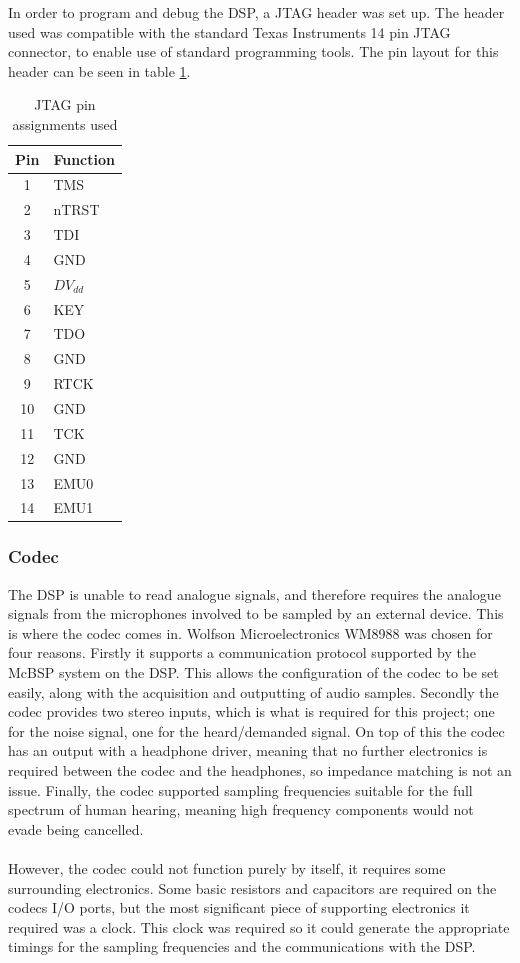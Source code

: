 \noindent In order to program and debug the DSP, a JTAG header was set up.
The header used was compatible with the standard Texas Instruments 14 pin JTAG connector, to enable use of standard programming tools.
The pin layout for this header can be seen in table \ref{tab:jtagpinout}.

\begin{table}[H]
	\centering
	\begin{tabular}[c]{| c | l |}
		\hline
		Pin	& Function	\\
		\hline
		1	& TMS		\\
		2	& nTRST		\\
		3	& TDI		\\
		4	& GND		\\
		5	& $DV_{dd}$	\\
		6	& KEY		\\
		7	& TDO		\\
		8	& GND		\\
		9	& RTCK		\\
		10	& GND		\\
		11	& TCK		\\
		12	& GND		\\
		13	& EMU0		\\
		14	& EMU1		\\
		\hline
	\end{tabular}
	\caption{JTAG pin assignments used}
	\label{tab:jtagpinout}
\end{table}

\subsubsection{Codec}
The DSP is unable to read analogue signals, and therefore requires the analogue signals from the microphones involved to be sampled by an external device.
This is where the codec comes in.
Wolfson Microelectronics WM8988 was chosen for four reasons.
Firstly it supports a communication protocol supported by the McBSP system on the DSP.
This allows the configuration of the codec to be set easily, along with the acquisition and outputting of audio samples.
Secondly the codec provides two stereo inputs, which is what is required for this project; one for the noise signal, one for the heard/demanded signal.
On top of this the codec has an output with a headphone driver, meaning that no further electronics is required between the codec and the headphones, so impedance matching is not an issue.
Finally, the codec supported sampling frequencies suitable for the full spectrum of human hearing, meaning high frequency components would not evade being cancelled.
\\
\\
However, the codec could not function purely by itself, it requires some surrounding electronics.
Some basic resistors and capacitors are required on the codecs I/O ports, but the most significant piece of supporting electronics it required was a clock.
This clock was required so it could generate the appropriate timings for the sampling frequencies and the communications with the DSP.


